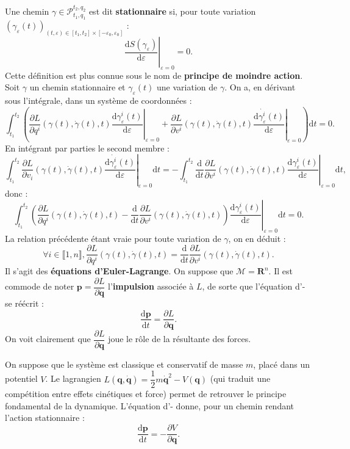 \documentclass[12pt,a4paper]{article}
\theoremstyle{definition}
\begin{document}
Une chemin $\gamma\in\mathcal{P}_{t_1,q_1}^{t_2,q_2}$ est dit \textbf{stationnaire} si, pour toute variation\newline $(\gamma_\varepsilon(t))_{(t,\varepsilon)\in [t_1,t_2]\times[-\varepsilon_0,\varepsilon_0]}$ :
$$
\left.\dfrac{\mathrm{d}S(\gamma_\varepsilon)}{\mathrm{d}\varepsilon}\right|_{\varepsilon=0}=0.
$$
Cette définition est plus connue sous le nom de \textbf{principe de moindre action}.
Soit $\gamma$ un chemin stationnaire et $\gamma_\varepsilon(t)$ une variation de $\gamma$. On a, en dérivant sous l'intégrale, dans un système de coordonnées :
$$
\int_{t_1}^{t_2}\left(\dfrac{\partial L}{\partial q^i}(\gamma(t),\dot{\gamma}(t),t)\left.\dfrac{\mathrm{d}\gamma^i_\varepsilon(t)}{\mathrm{d}\varepsilon}\right|_{\varepsilon=0}+\dfrac{\partial L}{\partial v^i}(\gamma(t),\dot{\gamma}(t),t)\left.\dfrac{\mathrm{d}\dot{\gamma_\varepsilon^i}(t)}{\mathrm{d}\varepsilon}\right|_{\varepsilon=0}\right)\mathrm{d}t=0.
$$
En intégrant par parties le second membre :
$$
\int_{t_1}^{t_2}\dfrac{\partial L}{\partial v_i}(\gamma(t),\dot{\gamma}(t),t)\left.\dfrac{\mathrm{d}\dot{\gamma_\varepsilon^i}(t)}{\mathrm{d}\varepsilon}\right|_{\varepsilon=0}\mathrm{d}t=-\int_{t_1}^{t_2}\dfrac{\mathrm{d}}{\mathrm{d}t}\dfrac{\partial L}{\partial v^i}(\gamma(t),\dot{\gamma}(t),t)\left.\dfrac{\mathrm{d}\gamma_{\varepsilon}^i(t)}{\mathrm{d}\varepsilon}\right|_{\varepsilon=0}\mathrm{d}t,
$$
donc :
$$\int_{t_1}^{t_2}\left(\dfrac{\partial L}{\partial q^i}(\gamma(t),\dot{\gamma}(t),t)-\dfrac{\mathrm{d}}{\mathrm{d}t}\dfrac{\partial L}{\partial v^i}(\gamma(t),\dot{\gamma}(t),t)\right)\left.\dfrac{\mathrm{d}\gamma_\varepsilon^i(t)}{\mathrm{d}\varepsilon}\right|_{\varepsilon=0}\mathrm{d}t=0.$$
La relation précédente étant vraie pour toute variation de $\gamma$, on en déduit :
$$\forall i\in\llbracket 1,n\rrbracket, \dfrac{\partial L}{\partial q^i}(\gamma(t),\dot{\gamma}(t),t)=\dfrac{\mathrm{d}}{\mathrm{d}t}\dfrac{\partial L}{\partial v^i}(\gamma(t),\dot{\gamma}(t),t).
$$
Il s'agit des \textbf{équations d'Euler-Lagrange}.
\newpage
On suppose que $\mathcal{M}=\mathbf{R}^n$.
Il est commode de noter $\mathbf{p}=\dfrac{\partial L}{\partial\dot{\mathbf{q}}}$ l'\textbf{impulsion} associée à $L$, de sorte que l'équation d'- se réécrit :
$$
\dfrac{\mathrm{d}\mathbf{p}}{\mathrm{d}t}=\dfrac{\partial L}{\partial\mathbf{q}}.
$$
On voit clairement que $\dfrac{\partial L}{\partial\mathbf{q}}$ joue le rôle de la résultante des forces.

On suppose que le système est classique et conservatif de masse $m$, placé dans un potentiel $V$. Le lagrangien $ L(\mathbf{q},\dot{\mathbf{q}})=\dfrac{1}{2}m\dot{\mathbf{q}}^2-V(\mathbf{q})$ (qui traduit une compétition entre effets cinétiques et force) permet de retrouver le principe fondamental de la dynamique.\newline
L'équation d'- donne, pour un chemin rendant l'action stationnaire :
$$
\dfrac{\mathrm{d}\mathbf{p}}{\mathrm{d}t}=-\dfrac{\partial V}{\partial\mathbf{q}}.
$$
\newpage
\end{document}
